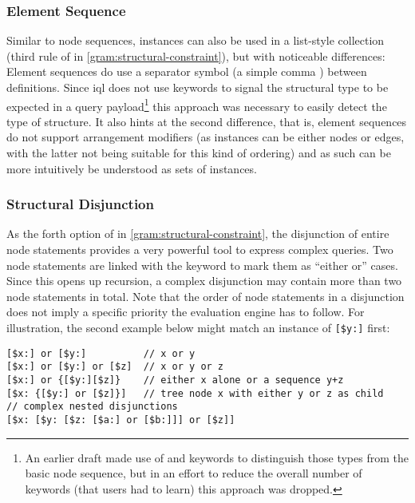 \documentclass[11pt,a4paper]{report}
\begin{document}
\subsubsection{Element Sequence}
\label{sec:element-sequence}
\noindent Similar to node sequences,  instances can also be used in a list-style collection (third rule of  in \cref{gram:structural-constraint}), but with noticeable differences: 
Element sequences do use a separator symbol (a simple comma \lit{,}) between  definitions.
Since \ac{iql} does not use keywords to signal the structural type to be expected in a query payload\footnote{An earlier draft made use of  and  keywords to distinguish those types from the basic node sequence, but in an effort to reduce the overall number of keywords (that users had to learn) this approach was dropped.} this approach was necessary to easily detect the type of structure.
It also hints at the second difference, that is, element sequences do not support arrangement modifiers (as  instances can be either nodes or edges, with the latter not being suitable for this kind of ordering) and as such can be more intuitively be understood as sets of  instances.

\subsubsection{Structural Disjunction}
\label{sec:structural-disjunction}
\noindent As the forth option of  in \cref{gram:structural-constraint}, the disjunction of entire node statements provides a very powerful tool to express complex queries.
Two node statements are linked with the  keyword to mark them as ``either or'' cases.
Since this opens up recursion, a complex disjunction may contain more than two node statements in total.
Note that the order of node statements in a disjunction does not imply a specific priority the evaluation engine has to follow.
For illustration, the second example below might match an instance of \verb|[$y:]| first:
\begin{Verbatim}[samepage=true]
[$x:] or [$y:]          // x or y
[$x:] or [$y:] or [$z]  // x or y or z
[$x:] or {[$y:][$z]}    // either x alone or a sequence y+z
[$x: {[$y:] or [$z]}]   // tree node x with either y or z as child
// complex nested disjunctions
[$x: [$y: [$z: [$a:] or [$b:]]] or [$z]]
\end{Verbatim}
\end{document}
